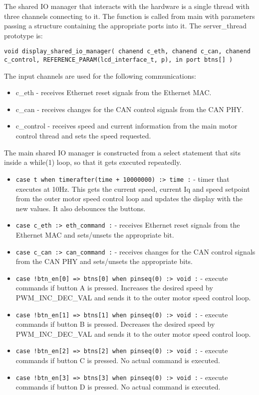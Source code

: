 The shared IO manager that interacts with the hardware is a single thread with three channels connecting to it.
The function is called from main with parameters passing a structure containing the appropriate ports into it.
The server\_thread prototype is:

\tiny
\lstset{breaklines=true}
\begin{lstlisting}
void display_shared_io_manager( chanend c_eth, chanend c_can, chanend c_control, REFERENCE_PARAM(lcd_interface_t, p), in port btns[] )
\end{lstlisting}

The input channels are used for the following communications:

\begin{itemize}
\item c\_eth - receives Ethernet reset signals from the Ethernet MAC.
\item c\_can - receives changes for the CAN control signals from the CAN PHY.
\item c\_control - receives speed and current information from the main motor control thread and sets the speed requested.
\end{itemize}

The main shared IO manager is constructed from a select statement that sits inside a while(1) loop, so that it gets executed repeatedly.

\begin{itemize}
\item \verb!case t when timerafter(time + 10000000) :> time :! - timer that executes at 10Hz. This gets the current speed, current Iq and speed setpoint from the outer motor speed control loop and updates the display with the new values. It also debounces the buttons.
\item \verb!case c_eth :> eth_command :! - receives Ethernet reset signals from the Ethernet MAC and sets/unsets the appropriate bit.
\item \verb!case c_can :> can_command :! - receives changes for the CAN control signals from the CAN PHY and sets/unsets the appropriate bits.
\item \verb"case !btn_en[0] => btns[0] when pinseq(0) :> void :" - execute commands if button A is pressed. Increases the desired speed by PWM\_INC\_DEC\_VAL and sends it to the outer motor speed control loop.
\item \verb"case !btn_en[1] => btns[1] when pinseq(0) :> void :" - execute commands if button B is pressed. Decreases the desired speed by PWM\_INC\_DEC\_VAL and sends it to the outer motor speed control loop.
\item \verb"case !btn_en[2] => btns[2] when pinseq(0) :> void :" - execute commands if button C is pressed. No actual command is executed.
\item \verb"case !btn_en[3] => btns[3] when pinseq(0) :> void :" - execute commands if button D is pressed. No actual command is executed.
\end{itemize}


